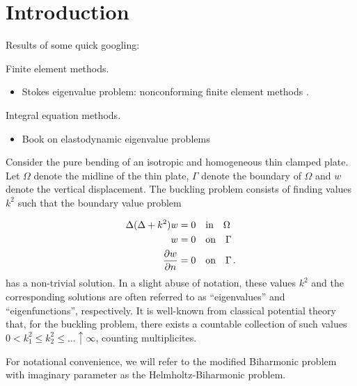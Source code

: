 \section{Introduction}

Results of some quick googling:

Finite element methods.
\begin{itemize}
\item Stokes eigenvalue problem: nonconforming finite
  element methods \cite{jia2009approximation}.
\end{itemize}

Integral equation methods.
\begin{itemize}
\item Book on elastodynamic eigenvalue problems
  \cite{kitahara2014boundary}
\end{itemize}

Consider the pure bending of an isotropic and homogeneous thin clamped
plate. 
Let $\Omega$ denote the midline of the thin plate, $\Gamma$ denote the 
boundary of $\Omega$ and $w$ denote the vertical displacement.
The buckling problem consists of finding 
values $k^{2}$ such that the boundary value problem

\begin{align}
\Delta (\Delta + k^2) w &= 0 \quad \text{in} \quad \Omega \label{eq:buck1} \\
w &= 0 \quad \text{on} \quad \Gamma \label{eq:buck2}\\
\frac{\partial w}{\partial n} &=0 \quad \text{on} \quad \Gamma \label{eq:buck3} \,.
\end{align}
has a non-trivial solution. In a slight abuse of notation,
these values $k^2$ and the corresponding
solutions are often referred to as ``eigenvalues'' and ``eigenfunctions'',
respectively.
It is well-known from classical potential theory that, 
for the buckling problem, there exists a countable collection of
such values $0 < k_{1}^{2} \leq k_{2}^2 \leq \ldots \uparrow \infty$,
counting multiplicites.
\begin{remark}
For notational convenience,  
we will refer to the modified Biharmonic problem
with imaginary parameter as the Helmholtz-Biharmonic problem.
\end{remark}


